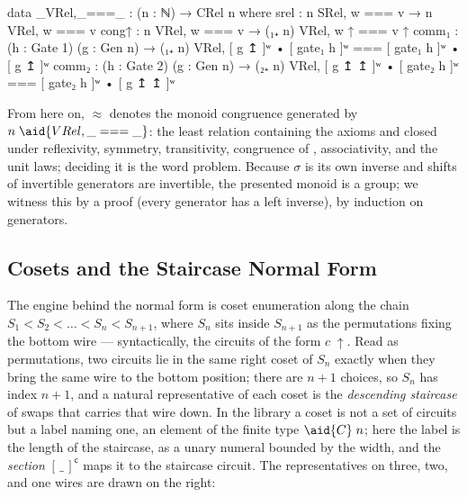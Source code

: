 \begin{code}
data _VRel,_===_ : (n : ℕ) → CRel n where
  srel  : n SRel, w === v → n VRel, w === v
  cong↑ : n VRel, w === v → (₁₊ n) VRel, w ↑ === v ↑
  comm₁ : (h : Gate 1) (g : Gen n) → (₁₊ n) VRel, [ g ↥ ]ʷ • [ gate₁ h ]ʷ === [ gate₁ h ]ʷ • [ g ↥ ]ʷ
  comm₂ : (h : Gate 2) (g : Gen n) → (₂₊ n) VRel, [ g ↥ ↥ ]ʷ • [ gate₂ h ]ʷ === [ gate₂ h ]ʷ • [ g ↥ ↥ ]ʷ
\end{code}

From here on,
$\approx$ denotes the monoid congruence generated by
$n\;\aid{VRel,{\_}==={\_}}$: the least relation
containing the axioms and closed under reflexivity, symmetry, transitivity,
congruence of , associativity, and the unit laws; deciding it is
the word problem.  Because $\sigma$ is its own inverse and shifts of
invertible generators are invertible, the presented monoid is a group; we
witness this by a  proof (every generator has a left
inverse), by induction on generators.

\subsection{Cosets and the Staircase Normal Form}\label{app:sn-cosets}

The engine behind the normal form is coset enumeration along the chain
$S_1 < S_2 < \dots < S_n < S_{n+1}$, where $S_n$ sits inside $S_{n+1}$ as
the permutations fixing the bottom wire --- syntactically, the circuits
of the form $c\;{\uparrow}$.  Read as permutations, two circuits lie in the
same right coset of $S_n$ exactly when they bring the same wire to the
bottom position; there are $n{+}1$ choices, so $S_n$ has index $n{+}1$,
and a natural representative of each coset is the \emph{descending
staircase} of swaps that carries that wire down.  In the library a coset
is not a set of circuits but a label naming one, an element of the finite type
$\aid{C}\;n$; here the label is the length of the staircase, as a unary
numeral bounded by the width, and the \emph{section} $[\,\_\,]^{\mathsf
c}$ maps it to the staircase circuit.  The representatives on three,
two, and one wires are drawn on the right:

